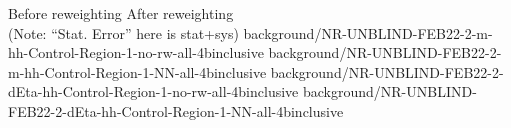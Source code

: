 {{\tiny Before reweighting\vspace{2mm}}}
{{\tiny After reweighting\\\vspace{-2mm}(Note: ``Stat. Error'' here is stat+sys)}}
{background/NR-UNBLIND-FEB22-2-m-hh-Control-Region-1-no-rw-all-4binclusive}
{background/NR-UNBLIND-FEB22-2-m-hh-Control-Region-1-NN-all-4binclusive}
{background/NR-UNBLIND-FEB22-2-dEta-hh-Control-Region-1-no-rw-all-4binclusive}
{background/NR-UNBLIND-FEB22-2-dEta-hh-Control-Region-1-NN-all-4binclusive}

